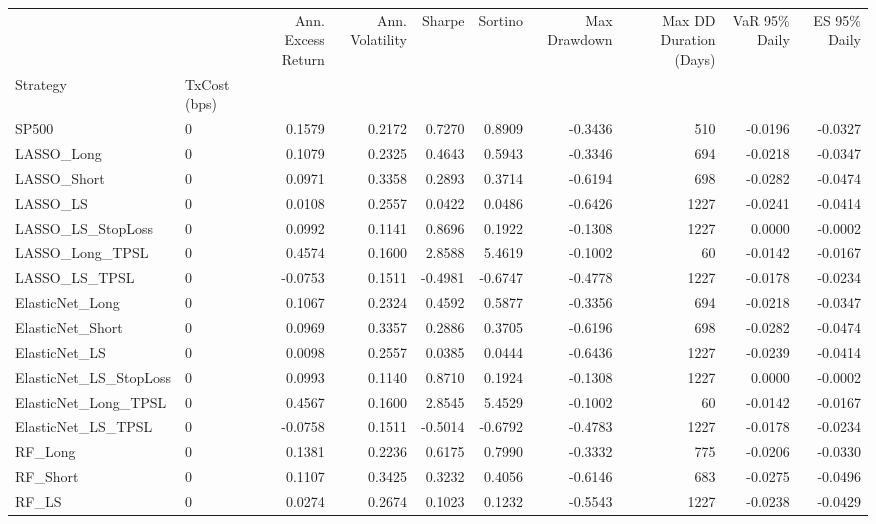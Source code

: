\begin{tabular}{llrrrrrrrr}
\toprule
 &  & Ann. Excess Return & Ann. Volatility & Sharpe & Sortino & Max Drawdown & Max DD Duration (Days) & VaR 95\% Daily & ES 95\% Daily \\
Strategy & TxCost (bps) &  &  &  &  &  &  &  &  \\
\midrule
SP500 & 0 & 0.1579 & 0.2172 & 0.7270 & 0.8909 & -0.3436 & 510 & -0.0196 & -0.0327 \\
\cline{1-10}
LASSO\_Long & 0 & 0.1079 & 0.2325 & 0.4643 & 0.5943 & -0.3346 & 694 & -0.0218 & -0.0347 \\
\cline{1-10}
LASSO\_Short & 0 & 0.0971 & 0.3358 & 0.2893 & 0.3714 & -0.6194 & 698 & -0.0282 & -0.0474 \\
\cline{1-10}
LASSO\_LS & 0 & 0.0108 & 0.2557 & 0.0422 & 0.0486 & -0.6426 & 1227 & -0.0241 & -0.0414 \\
\cline{1-10}
LASSO\_LS\_StopLoss & 0 & 0.0992 & 0.1141 & 0.8696 & 0.1922 & -0.1308 & 1227 & 0.0000 & -0.0002 \\
\cline{1-10}
LASSO\_Long\_TPSL & 0 & 0.4574 & 0.1600 & 2.8588 & 5.4619 & -0.1002 & 60 & -0.0142 & -0.0167 \\
\cline{1-10}
LASSO\_LS\_TPSL & 0 & -0.0753 & 0.1511 & -0.4981 & -0.6747 & -0.4778 & 1227 & -0.0178 & -0.0234 \\
\cline{1-10}
ElasticNet\_Long & 0 & 0.1067 & 0.2324 & 0.4592 & 0.5877 & -0.3356 & 694 & -0.0218 & -0.0347 \\
\cline{1-10}
ElasticNet\_Short & 0 & 0.0969 & 0.3357 & 0.2886 & 0.3705 & -0.6196 & 698 & -0.0282 & -0.0474 \\
\cline{1-10}
ElasticNet\_LS & 0 & 0.0098 & 0.2557 & 0.0385 & 0.0444 & -0.6436 & 1227 & -0.0239 & -0.0414 \\
\cline{1-10}
ElasticNet\_LS\_StopLoss & 0 & 0.0993 & 0.1140 & 0.8710 & 0.1924 & -0.1308 & 1227 & 0.0000 & -0.0002 \\
\cline{1-10}
ElasticNet\_Long\_TPSL & 0 & 0.4567 & 0.1600 & 2.8545 & 5.4529 & -0.1002 & 60 & -0.0142 & -0.0167 \\
\cline{1-10}
ElasticNet\_LS\_TPSL & 0 & -0.0758 & 0.1511 & -0.5014 & -0.6792 & -0.4783 & 1227 & -0.0178 & -0.0234 \\
\cline{1-10}
RF\_Long & 0 & 0.1381 & 0.2236 & 0.6175 & 0.7990 & -0.3332 & 775 & -0.0206 & -0.0330 \\
\cline{1-10}
RF\_Short & 0 & 0.1107 & 0.3425 & 0.3232 & 0.4056 & -0.6146 & 683 & -0.0275 & -0.0496 \\
\cline{1-10}
RF\_LS & 0 & 0.0274 & 0.2674 & 0.1023 & 0.1232 & -0.5543 & 1227 & -0.0238 & -0.0429 \\

\end{tabular}
